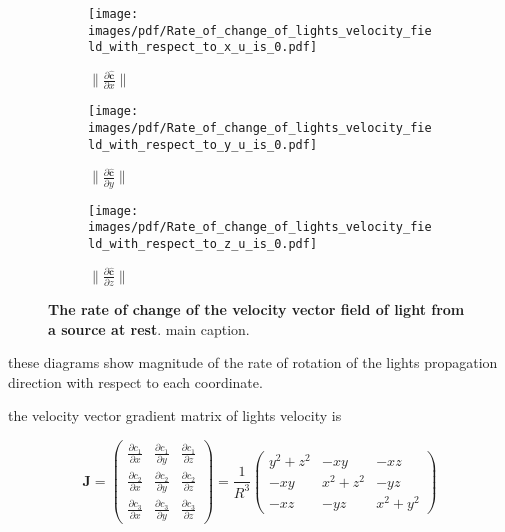 \begin{figure}[H]
	\centering
	\begin{subfigure}{0.32\textwidth}
		\centering
		\texttt{[image: images/pdf/Rate\_of\_change\_of\_lights\_velocity\_field\_with\_respect\_to\_x\_u\_is\_0.pdf]}
		\caption{$\|\frac{\partial \mathbf{\hat{c}}}{\partial x}\|$}
		\label{fig: Rate of change of lights velocity field of rest source subfig_1}
	\end{subfigure}
	\begin{subfigure}{0.32\textwidth}
		\centering
		\texttt{[image: images/pdf/Rate\_of\_change\_of\_lights\_velocity\_field\_with\_respect\_to\_y\_u\_is\_0.pdf]}
		\caption{$\|\frac{\partial \mathbf{\hat{c}}}{\partial y}\|$}
		\label{fig: Rate of change of lights velocity field of rest source subfig_2}
	\end{subfigure}
	\begin{subfigure}{0.32\textwidth}
		\centering
		\texttt{[image: images/pdf/Rate\_of\_change\_of\_lights\_velocity\_field\_with\_respect\_to\_z\_u\_is\_0.pdf]}
		\caption{$\|\frac{\partial \mathbf{\hat{c}}}{\partial z}\|$}
		\label{fig: Rate of change of lights velocity field of rest source subfig_3}
	\end{subfigure}
	\caption{\textbf{The rate of change of the velocity vector field of light from a source at rest}. main caption.}
	\label{fig: Rate of change of lights velocity field of rest source}
\end{figure}

these diagrams show magnitude of the rate of rotation of the lights propagation direction with respect to each coordinate.

the velocity vector gradient matrix of lights velocity is

\begin{equation}
	\mathbf{J} =
	\begin{pmatrix}
		\frac{\partial c_1}{\partial x} & \frac{\partial c_1}{\partial y} & \frac{\partial c_1}{\partial z} \\
		\frac{\partial c_2}{\partial x} & \frac{\partial c_2}{\partial y} & \frac{\partial c_2}{\partial z}
		\\
		\frac{\partial c_3}{\partial x} & \frac{\partial c_3}{\partial y} & \frac{\partial c_3}{\partial z}
	\end{pmatrix}
	= \frac{1}{ R^3 }
	\begin{pmatrix}
		y^2 + z^2 & -xy       & -xz       \\
		-xy       & x^2 + z^2 & -yz       \\
		-xz       & -yz       & x^2 + y^2
	\end{pmatrix}
\end{equation}

